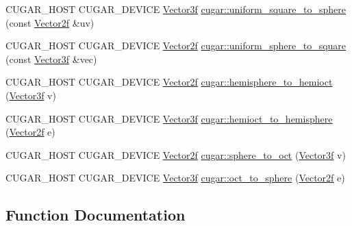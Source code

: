 \begin{DoxyCompactItemize}
\item 
C\+U\+G\+A\+R\+\_\+\+H\+O\+ST C\+U\+G\+A\+R\+\_\+\+D\+E\+V\+I\+CE \hyperlink{structcugar_1_1_vector}{Vector3f} \hyperlink{group__spherical__mappings_gae75ef450df309874ff133b4ec8daee40}{cugar\+::uniform\+\_\+square\+\_\+to\+\_\+sphere} (const \hyperlink{structcugar_1_1_vector}{Vector2f} \&uv)
\item 
C\+U\+G\+A\+R\+\_\+\+H\+O\+ST C\+U\+G\+A\+R\+\_\+\+D\+E\+V\+I\+CE \hyperlink{structcugar_1_1_vector}{Vector2f} \hyperlink{group__spherical__mappings_gaf091547e7d69c8125c7b037aa2d5bd5c}{cugar\+::uniform\+\_\+sphere\+\_\+to\+\_\+square} (const \hyperlink{structcugar_1_1_vector}{Vector3f} \&vec)
\item 
C\+U\+G\+A\+R\+\_\+\+H\+O\+ST C\+U\+G\+A\+R\+\_\+\+D\+E\+V\+I\+CE \hyperlink{structcugar_1_1_vector}{Vector2f} \hyperlink{group__spherical__mappings_ga10f5d3f25177b94512dc15b59a0434bc}{cugar\+::hemisphere\+\_\+to\+\_\+hemioct} (\hyperlink{structcugar_1_1_vector}{Vector3f} v)
\item 
C\+U\+G\+A\+R\+\_\+\+H\+O\+ST C\+U\+G\+A\+R\+\_\+\+D\+E\+V\+I\+CE \hyperlink{structcugar_1_1_vector}{Vector3f} \hyperlink{group__spherical__mappings_ga8acf5ad9380c558633e1aee500d87089}{cugar\+::hemioct\+\_\+to\+\_\+hemisphere} (\hyperlink{structcugar_1_1_vector}{Vector2f} e)
\item 
C\+U\+G\+A\+R\+\_\+\+H\+O\+ST C\+U\+G\+A\+R\+\_\+\+D\+E\+V\+I\+CE \hyperlink{structcugar_1_1_vector}{Vector2f} \hyperlink{group__spherical__mappings_gad4cb74d8c6a86fdaf44bce3961fde975}{cugar\+::sphere\+\_\+to\+\_\+oct} (\hyperlink{structcugar_1_1_vector}{Vector3f} v)
\item 
C\+U\+G\+A\+R\+\_\+\+H\+O\+ST C\+U\+G\+A\+R\+\_\+\+D\+E\+V\+I\+CE \hyperlink{structcugar_1_1_vector}{Vector3f} \hyperlink{group__spherical__mappings_gad2300cdc769dfa8bb11e2b8452895545}{cugar\+::oct\+\_\+to\+\_\+sphere} (\hyperlink{structcugar_1_1_vector}{Vector2f} e)
\end{DoxyCompactItemize}


\subsection{Function Documentation}
\mbox{\label{group__spherical__mappings_ga31615ccce21cd9f1161aaabf87f89b9b}} 

